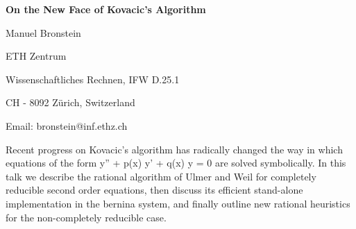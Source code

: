 

\centerline{\bf On the New Face of Kovacic's Algorithm}

\vskip 0.3cm

\centerline{Manuel Bronstein}
\centerline{ETH Zentrum}
\centerline{Wissenschaftliches Rechnen, IFW D.25.1}
\centerline{CH - 8092 Z\"{u}rich, Switzerland}
\centerline{Email: bronstein@inf.ethz.ch}

\vskip 0.3cm

Recent progress on Kovacic's algorithm has radically changed the way
in which equations of the form     y'' + p(x) y' + q(x) y = 0    are
solved symbolically. In this talk we describe the rational algorithm
of Ulmer and Weil for completely reducible second order equations, then
discuss its efficient stand-alone implementation in the bernina system, and
finally outline new rational heuristics for the non-completely reducible case.


